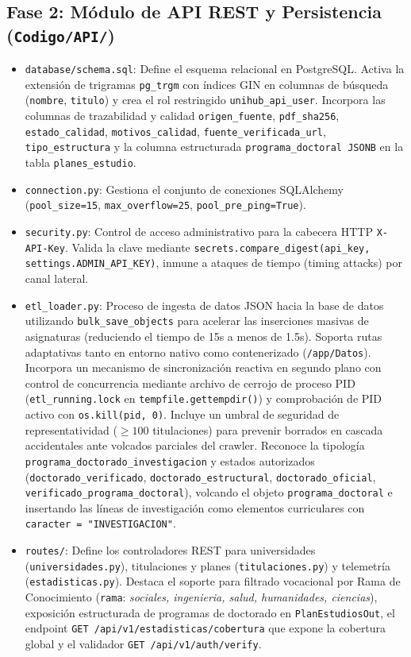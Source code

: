 \subsection{Fase 2: Módulo de API REST y Persistencia (\texttt{Codigo/API/})}
\begin{itemize}
    \item \texttt{database/schema.sql}: Define el esquema relacional en PostgreSQL. Activa la extensión de trigramas \texttt{pg\_trgm} con índices GIN en columnas de búsqueda (\texttt{nombre}, \texttt{titulo}) y crea el rol restringido \texttt{unihub\_api\_user}. Incorpora las columnas de trazabilidad y calidad \texttt{origen\_fuente}, \texttt{pdf\_sha256}, \texttt{estado\_calidad}, \texttt{motivos\_calidad}, \texttt{fuente\_verificada\_url}, \texttt{tipo\_estructura} y la columna estructurada \texttt{programa\_doctoral JSONB} en la tabla \texttt{planes\_estudio}.
    \item \texttt{connection.py}: Gestiona el conjunto de conexiones SQLAlchemy (\texttt{pool\_size=15}, \texttt{max\_overflow=25}, \texttt{pool\_pre\_ping=True}).
    \item \texttt{security.py}: Control de acceso administrativo para la cabecera HTTP \texttt{X-API-Key}. Valida la clave mediante \texttt{secrets.compare\_digest(api\_key, settings.ADMIN\_API\_KEY)}, inmune a ataques de tiempo (timing attacks) por canal lateral.
    \item \texttt{etl\_loader.py}: Proceso de ingesta de datos JSON hacia la base de datos utilizando \texttt{bulk\_save\_objects} para acelerar las inserciones masivas de asignaturas (reduciendo el tiempo de 15s a menos de 1.5s). Soporta rutas adaptativas tanto en entorno nativo como contenerizado (\texttt{/app/Datos}). Incorpora un mecanismo de sincronización reactiva en segundo plano con control de concurrencia mediante archivo de cerrojo de proceso PID (\texttt{etl\_running.lock} en \texttt{tempfile.gettempdir()}) y comprobación de PID activo con \texttt{os.kill(pid, 0)}. Incluye un umbral de seguridad de representatividad ($\ge 100$ titulaciones) para prevenir borrados en cascada accidentales ante volcados parciales del crawler. Reconoce la tipología \texttt{programa\_doctorado\_investigacion} y estados autorizados (\texttt{doctorado\_verificado}, \texttt{doctorado\_estructural}, \texttt{doctorado\_oficial}, \texttt{verificado\_programa\_doctoral}), volcando el objeto \texttt{programa\_doctoral} e insertando las líneas de investigación como elementos curriculares con \texttt{caracter = "INVESTIGACION"}.
    \item \texttt{routes/}: Define los controladores REST para universidades (\texttt{universidades.py}), titulaciones y planes (\texttt{titulaciones.py}) y telemetría (\texttt{estadisticas.py}). Destaca el soporte para filtrado vocacional por Rama de Conocimiento (\texttt{rama}: \emph{sociales, ingenieria, salud, humanidades, ciencias}), exposición estructurada de programas de doctorado en \texttt{PlanEstudiosOut}, el endpoint \texttt{GET /api/v1/estadisticas/cobertura} que expone la cobertura global y el validador \texttt{GET /api/v1/auth/verify}.
\end{itemize}

